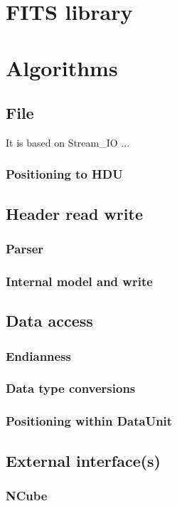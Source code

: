 \documentclass[a4paper,10pt]{article}
\begin{document}
\tableofcontents

\section{FITS library}


\section{Algorithms}

\subsection{File}
It is based on Stream\_IO ...
\subsubsection{Positioning to HDU}

\subsection{Header read write}
\subsubsection{Parser}
\subsubsection{Internal model and write}

\subsection{Data access}
\subsubsection{Endianness}
\subsubsection{Data type conversions}
\subsubsection{Positioning within DataUnit}

\subsection{External interface(s)}
\subsubsection{NCube}
\end{document}
